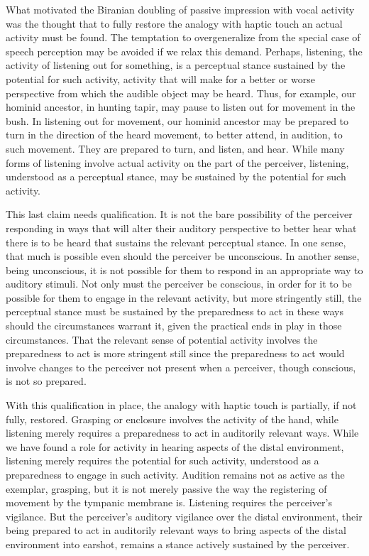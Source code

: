 What motivated the Biranian doubling of passive impression with vocal activity was the thought that to fully restore the analogy with haptic touch an actual activity must be found. The temptation to overgeneralize from the special case of speech perception may be avoided if we relax this demand. Perhaps, listening, the activity of listening out for something, is a perceptual stance sustained by the potential for such activity, activity that will make for a better or worse perspective from which the audible object may be heard. Thus, for example, our hominid ancestor, in hunting tapir, may pause to listen out for movement in the bush. In listening out for movement, our hominid ancestor may be prepared to turn in the direction of the heard movement, to better attend, in audition, to such movement. They are prepared to turn, and listen, and hear. While many forms of listening involve actual activity on the part of the perceiver, listening, understood as a perceptual stance, may be sustained by the potential for such activity.

This last claim needs qualification. It is not the bare possibility of the perceiver responding in ways that will alter their auditory perspective to better hear what there is to be heard that sustains the relevant perceptual stance. In one sense, that much is possible even should the perceiver be unconscious. In another sense, being unconscious, it is not possible for them to respond in an appropriate way to auditory stimuli. Not only must the perceiver be conscious, in order for it to be possible for them to engage in the relevant activity, but more stringently still, the perceptual stance must be sustained by the preparedness to act in these ways should the circumstances warrant it, given the practical ends in play in those circumstances. That the relevant sense of potential activity involves the preparedness to act is more stringent still since the preparedness to act would involve changes to the perceiver not present when a perceiver, though conscious, is not so prepared.

With this qualification in place, the analogy with haptic touch is partially, if not fully, restored. Grasping or enclosure involves the activity of the hand, while listening merely requires a preparedness to act in auditorily relevant ways. While we have found a role for activity in hearing aspects of the distal environment, listening merely requires the potential for such activity, understood as a preparedness to engage in such activity. Audition remains not as active as the exemplar, grasping, but it is not merely passive the way the registering of movement by the tympanic membrane is. Listening requires the perceiver's vigilance. But the perceiver's auditory vigilance over the distal environment, their being prepared to act in auditorily relevant ways to bring aspects of the distal environment into earshot, remains a stance actively sustained by the perceiver.

